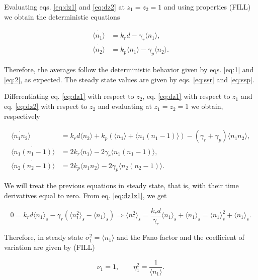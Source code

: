 Evaluating eqs. \ref{eq:dz1} and \ref{eq:dz2} at $z_1 = z_2 = 1$ and using properties (FILL) we obtain the deterministic equations

\begin{align*}
\dot{\langle n_1 \rangle}&= k_rd - \gamma_r \langle n_1 \rangle,\\
\dot{\langle n_2 \rangle}&= k_p\langle n_1 \rangle - \gamma_p \langle n_2 \rangle.
\end{align*}

Therefore, the averages follow the deterministic behavior given by eqs. \ref{eq:1} and \ref{eq:2}, as expected. The steady state values are given by eqs. \ref{eq:ssr} and \ref{eq:ssp}.

Differentiating eq. \ref{eq:dz1} with respect to $z_2$, eq. \ref{eq:dz1} with respect to $z_1$ and eq. \ref{eq:dz2} with respect to $z_2$ and evaluating at $z_1 = z_2 = 1$ we obtain, respectively

\begin{align}
\dot{\langle n_1n_2\rangle} &= k_rd\langle n_2 \rangle + k_p\left(\langle n_1\rangle + \langle n_1(n_1-1) \rangle \right) - \left( \gamma_r + \gamma_p \right)\langle n_1n_2 \rangle,\label{eq:dz1z2}\\
\dot{\langle n_1(n_1-1)\rangle} &= 2k_r\langle n_1\rangle-2\gamma_r\langle n_1(n_1-1) \rangle, \label{eq:dz1z1}\\
\dot{\langle n_2(n_2-1)\rangle} &= 2k_p\langle n_1n_2 \rangle - 2\gamma_p\langle n_2(n_2-1)\rangle. \label{eq:dz2z2}
\end{align}

We will treat the previous equations in steady state, that is, with their time derivatives equal to zero. From  eq. \ref{eq:dz1z1}, we get

\begin{equation}
\label{eq:pren1}
0 = k_rd \langle n_1 \rangle_s -\gamma_r \left(\langle n_1^2 \rangle_s - \langle n_1 \rangle_s \right) \Rightarrow \langle n_1^2 \rangle_s = \frac{k_rd}{\gamma_r}\langle n_1 \rangle_s + \langle n_1 \rangle_s = \langle n_1 \rangle_s^2 + \langle n_1 \rangle_s.
\end{equation}

Therefore, in steady state $\sigma_1^2 = \langle n_1 \rangle$ and the Fano factor and the coefficient of variation are given by (FILL)

\begin{equation}
\label{noise1}
\boxed{\nu_1 = 1}, \quad\quad \boxed{\eta_1^2 = \frac{1}{\langle n_1 \rangle}}.
\end{equation}

